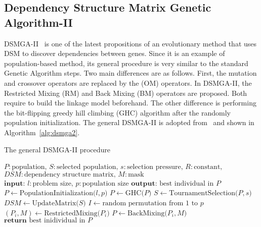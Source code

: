 \subsection{Dependency Structure Matrix Genetic Algorithm-II}

DSMGA-II~\cite{dsmga2} is one of the latest propositions of an evolutionary method that uses DSM to discover dependencies between genes. Since it is an example of population-based method, its general procedure is very similar to the standard Genetic Algorithm steps. Two main differences are as follows. First, the mutation and crossover operators are replaced by the (OM) operators. In DSMGA-II, the Restricted Mixing (RM) and Back Mixing (BM) operators are proposed. Both require to build the linkage model beforehand. The other difference is performing the bit-flipping greedy hill climbing (GHC) algorithm after the randomly population initialization. The general DSMGA-II is adopted from~\cite{dsmga2e} and shown in Algorithm~\ref{alg:dsmga2}.

\begin{algorithm}
	\caption{The general DSMGA-II procedure}
	\label{alg:dsmga2}
	\begin{algorithmic}[1]
		\State $P: \text{population, } S: \text{selected population,}$
		\State $s: \text{selection pressure, } R: \text{constant,}$
		\State $DSM: \text{dependency structure matrix, } M: \text{mask}$
		\State $\textbf{input: } l: \text{problem size, } p: \text{population size}$
		\State $\textbf{output: } \text{best individual in } P$
		\State $P \gets \text{PopulationInitialization($l, p$)}$
		\State $P \gets \text{GHC($P$)}$
			\State $S \gets \text{TournamentSelection($P, s$)}$
			\State $DSM \gets \text{UpdateMatrix($S$)}$
				\State $I \gets \text{random permutation from $1$ to $p$}$
					\State $(P_i, M) \gets \text{RestrictedMixing($P_i$)}$
						\State $P \gets \text{BackMixing($P_i, M$)}$
					\EndIf
				\EndFor
			\EndFor
		\EndWhile
		\State $\textbf{return } \text{best inidividual in } P$
	\end{algorithmic}
\end{algorithm}

